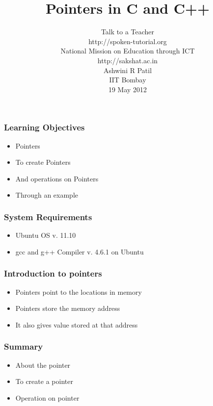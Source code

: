 \documentclass[17pt]{beamer}
\begin{document}
\sffamily \bfseries

\title
[Pointers in C and C++ \hspace{0.75cm}]
{Pointers in C and C++}
\author
[Ashwini R Patil]
{\small Talk to a Teacher \\http://spoken-tutorial.org \\ National Mission on Education
  through ICT \\ http://sakshat.ac.in \\ [0.5cm]
   Ashwini R Patil \\IIT Bombay \\[0.5cm]
{\small 19 May 2012}
}
\begin{frame}
   \titlepage
\end{frame}

\begin{frame}[fragile]
  \frametitle{Learning Objectives}\pause
  \begin{itemize}[<+-|alert@+>]
  \item Pointers
  \item To create Pointers
  \item And operations on Pointers
  \item Through an example
    \end{itemize}
\end{frame}
			
\begin{frame}
  \frametitle {System Requirements} \pause
  \begin{itemize}[<+-|alert@+>]
  \item Ubuntu OS v. 11.10
  \item gcc and g++ Compiler v. 4.6.1 on Ubuntu
  \end{itemize}
\end{frame}

	
\begin{frame}
  \frametitle{Introduction to pointers} \pause
    \begin{itemize}[<+-|alert@+>]
  \item Pointers point to the locations in memory
\item Pointers store the memory address 
\item It also gives value stored at that address
    \end{itemize}
\end{frame}
	

\begin{frame}
\frametitle{Summary}\pause
\begin{itemize}
\item About the pointer
\item To create a pointer
\item Operation on pointer
\end{itemize}
\end{frame}
\end{document}
